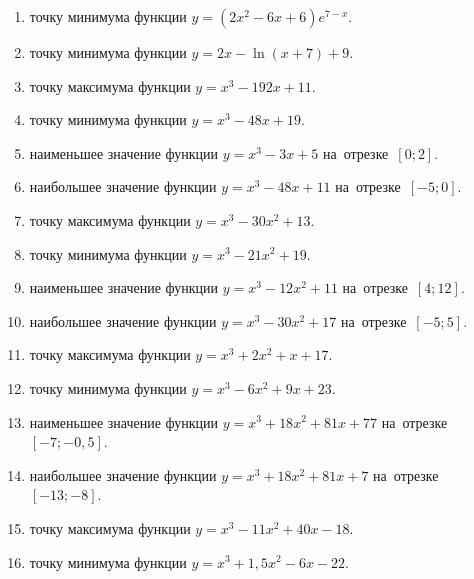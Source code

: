 \documentclass[a4paper,10pt]{article}
\begin{document}
\begin{enumerate}
\item {} точку минимума функции $y=\left(2x^2-6x+6\right){{e}^{7-x}}$.

\item {} точку минимума функции $y=2x-\ln \left(x+7\right)+9$.

\item {} точку максимума функции $y=x^3 -192x +11$.

\item {} точку минимума функции $y=x^3 -48x+19$.

\item {} наименьшее значение функции $y=x^3 -3x+5$ на~отрезке~$\left[0;2\right]$.

\item {} наибольшее значение функции $y=x^3 -48x+11$ на~отрезке~$\left[-5;0\right]$.

\item {} точку максимума функции $y=x^3 -30x^2+13$.

\item {} точку минимума функции $y=x^3 -21x^2+19$.

\item {} наименьшее значение функции $y=x^3 -12x^2+11$ на~отрезке~$\left[4;12\right]$.

\item {} наибольшее значение функции $y=x^3 -30x^2+17$ на~отрезке~$\left[-5;5\right]$.

\item {} точку максимума функции $y=x^3 +2x^2+x+17$.

\item {} точку минимума функции $y=x^3 -6x^2+9x+23$.

\item {} наименьшее значение функции $y=x^3 +18x^2+81x+77$ на~отрезке~$\left[-7;-0,5\right]$.

\item {} наибольшее значение функции $y=x^3 +18x^2+81x+7$ на~отрезке~$\left[-13;-8\right]$.

\item {} точку максимума функции $y=x^3 -11x^2+40x-18$.

\item {} точку минимума функции $y=x^3 +1,5x^2-6x-22$.


\end{enumerate}
\end{document}

